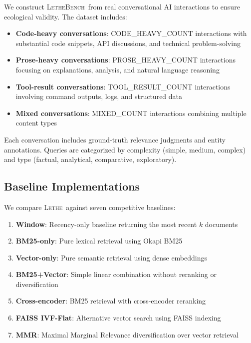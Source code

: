 \documentclass[letterpaper]{article}
\newcommand{\lethe}{\textsc{Lethe}}
\newcommand{\lethebench}{\textsc{LetheBench}}
\begin{document}
We construct \lethebench\ from real conversational AI interactions to ensure ecological validity. The dataset includes:

\begin{itemize}
    \item \textbf{Code-heavy conversations}: {{CODE_HEAVY_COUNT}} interactions with substantial code snippets, API discussions, and technical problem-solving
    \item \textbf{Prose-heavy conversations}: {{PROSE_HEAVY_COUNT}} interactions focusing on explanations, analysis, and natural language reasoning
    \item \textbf{Tool-result conversations}: {{TOOL_RESULT_COUNT}} interactions involving command outputs, logs, and structured data
    \item \textbf{Mixed conversations}: {{MIXED_COUNT}} interactions combining multiple content types
\end{itemize}

Each conversation includes ground-truth relevance judgments and entity annotations. Queries are categorized by complexity (simple, medium, complex) and type (factual, analytical, comparative, exploratory).

\subsection{Baseline Implementations}

We compare \lethe\ against seven competitive baselines:

\begin{enumerate}
    \item \textbf{Window}: Recency-only baseline returning the most recent $k$ documents
    \item \textbf{BM25-only}: Pure lexical retrieval using Okapi BM25
    \item \textbf{Vector-only}: Pure semantic retrieval using dense embeddings
    \item \textbf{BM25+Vector}: Simple linear combination without reranking or diversification  
    \item \textbf{Cross-encoder}: BM25 retrieval with cross-encoder reranking
    \item \textbf{FAISS IVF-Flat}: Alternative vector search using FAISS indexing
    \item \textbf{MMR}: Maximal Marginal Relevance diversification over vector retrieval
\end{enumerate}
\end{document}
